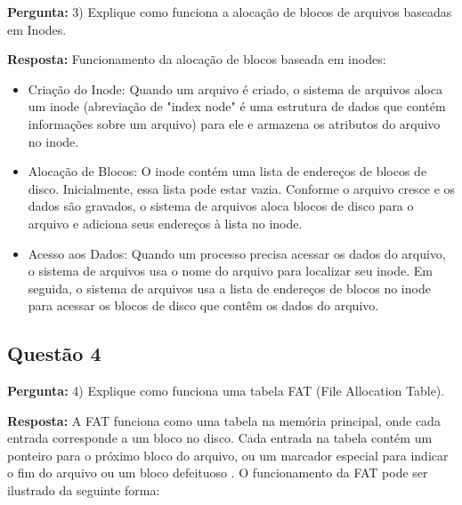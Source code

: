 \documentclass{article}
\begin{document}
\textbf{Pergunta:} 3) Explique como funciona a alocação de blocos de arquivos baseadas em Inodes.  \newline

\textbf{Resposta: } Funcionamento da alocação de blocos baseada em inodes:
\begin{itemize}
  \item Criação do Inode: Quando um arquivo é criado, o sistema de arquivos aloca um inode (abreviação de "index node" é uma estrutura de dados que contém informações sobre um arquivo) para ele e armazena os atributos do arquivo no inode.
  \item Alocação de Blocos: O inode contém uma lista de endereços de blocos de disco. Inicialmente, essa lista pode estar vazia. Conforme o arquivo cresce e os dados são gravados, o sistema de arquivos aloca blocos de disco para o arquivo e adiciona seus endereços à lista no inode.
  \item Acesso aos Dados: Quando um processo precisa acessar os dados do arquivo, o sistema de arquivos usa o nome do arquivo para localizar seu inode. Em seguida, o sistema de arquivos usa a lista de endereços de blocos no inode para acessar os blocos de disco que contêm os dados do arquivo.
\end{itemize}



\subsection{Questão 4}

\textbf{Pergunta:} 4) Explique como funciona uma tabela FAT (File Allocation Table). \newline

\textbf{Resposta:} A FAT funciona como uma tabela na memória principal, onde cada entrada corresponde a um bloco no disco. Cada entrada na tabela contém um ponteiro para o próximo bloco do arquivo, ou um marcador especial para indicar o fim do arquivo ou um bloco defeituoso \parencite[p. 196, 222]{tanenbaum2021}.
O funcionamento da FAT pode ser ilustrado da seguinte forma:
\end{document}
